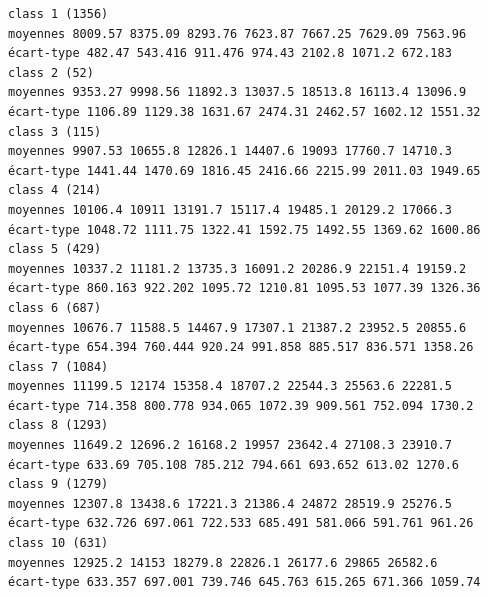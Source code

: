 \documentclass[land,article,submit,pdftex,moreauthors]{Definitions/mdpi}
\begin{document}
\begin{scriptsize}
\begin{verbatim}
class 1 (1356)
moyennes 8009.57 8375.09 8293.76 7623.87 7667.25 7629.09 7563.96
écart-type 482.47 543.416 911.476 974.43 2102.8 1071.2 672.183
class 2 (52)
moyennes 9353.27 9998.56 11892.3 13037.5 18513.8 16113.4 13096.9
écart-type 1106.89 1129.38 1631.67 2474.31 2462.57 1602.12 1551.32
class 3 (115)
moyennes 9907.53 10655.8 12826.1 14407.6 19093 17760.7 14710.3
écart-type 1441.44 1470.69 1816.45 2416.66 2215.99 2011.03 1949.65
class 4 (214)
moyennes 10106.4 10911 13191.7 15117.4 19485.1 20129.2 17066.3
écart-type 1048.72 1111.75 1322.41 1592.75 1492.55 1369.62 1600.86
class 5 (429)
moyennes 10337.2 11181.2 13735.3 16091.2 20286.9 22151.4 19159.2
écart-type 860.163 922.202 1095.72 1210.81 1095.53 1077.39 1326.36
class 6 (687)
moyennes 10676.7 11588.5 14467.9 17307.1 21387.2 23952.5 20855.6
écart-type 654.394 760.444 920.24 991.858 885.517 836.571 1358.26
class 7 (1084)
moyennes 11199.5 12174 15358.4 18707.2 22544.3 25563.6 22281.5
écart-type 714.358 800.778 934.065 1072.39 909.561 752.094 1730.2
class 8 (1293)
moyennes 11649.2 12696.2 16168.2 19957 23642.4 27108.3 23910.7
écart-type 633.69 705.108 785.212 794.661 693.652 613.02 1270.6
class 9 (1279)
moyennes 12307.8 13438.6 17221.3 21386.4 24872 28519.9 25276.5
écart-type 632.726 697.061 722.533 685.491 581.066 591.761 961.26
class 10 (631)
moyennes 12925.2 14153 18279.8 22826.1 26177.6 29865 26582.6
écart-type 633.357 697.001 739.746 645.763 615.265 671.366 1059.74


\end{verbatim}
\end{scriptsize}
\end{document}
